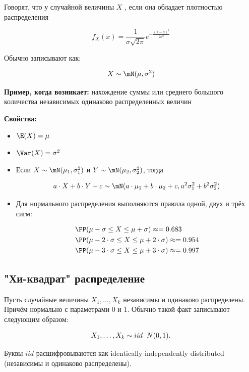 \documentclass[12pt, a4paper, oneside]{article}
\begin{document}
Говорят, что у случайной величины $X$ , если она обладает плотностью распределения

$$
f_{X}(x) = \frac{1}{\sigma \sqrt{2 \pi}} e^{-\tfrac{(x - \mu)^2}{2\sigma^2}}
$$

Обычно записывают как:

$$
X \sim \mN(\mu, \sigma^2)
$$

\textbf{Пример, когда возникает:} нахождение суммы или среднего большого количества независимых одинаково распределенных величин

\textbf{Свойства:}

\begin{itemize} 
\item $\E(X) = \mu$
\item $\Var(X) = \sigma^2$
\item Если $X \sim \mN(\mu_1, \sigma_1^2)$ и $Y \sim \mN(\mu_2, \sigma_2^2)$, тогда 

$$
a\cdot X + b \cdot Y + c \sim \mN(a\cdot \mu_1 + b \cdot \mu_2 + c, a^2 \sigma_1^2 + b^2 \sigma_2^2) 
$$

\item Для нормального распределения выполняются правила одной, двух и трёх сигм: 

\begin{equation*}
\begin{aligned}
& \PP(\mu - \sigma \le X \le \mu + \sigma) \approx = 0.683 \\
& \PP(\mu - 2\cdot \sigma \le X \le \mu + 2 \cdot \sigma) \approx = 0.954 \\
& \PP(\mu - 3 \cdot \sigma \le X \le \mu + 3 \cdot \sigma) \approx = 0.997
\end{aligned}
\end{equation*}
\end{itemize} 


\subsection*{"Хи-квадрат" распределение}

Пусть случайные величины $X_1, \ldots, X_k$ независимы и одинаково распределены. Причём нормально с параметрами $0$ и $1$. Обычно такой факт записывают следующим образом: 

$$
X_1, \ldots, X_k \sim iid \hspace{2mm} N(0,1).
$$ 

Буквы $iid$ расшифровываются как identically independently distributed (независимы и одинаково распределены).
\end{document}
